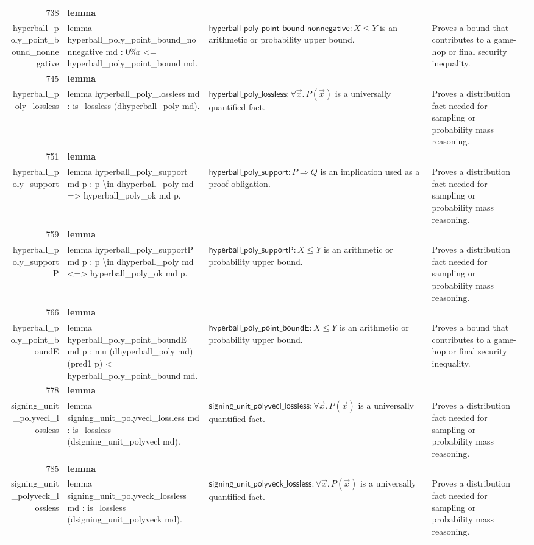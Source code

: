 \documentclass[10pt]{article}
\newcommand{\ec}[1]{\begingroup\ttfamily\scriptsize #1\endgroup}
\begin{document}
\begin{longtable}{r L{0.17\textwidth} L{0.26\textwidth} L{0.27\textwidth} L{0.20\textwidth}}
738 & \textbf{lemma}\\\ec{hyperball\_poly\_point\_bound\_nonnegative} & \ec{lemma hyperball\_poly\_point\_bound\_nonnegative md : 0\%r <= hyperball\_poly\_point\_bound md.} & \(\mathsf{hyperball\_poly\_point\_bound\_nonnegative} : X \le Y\) is an arithmetic or probability upper bound. & Proves a bound that contributes to a game-hop or final security inequality. \\
745 & \textbf{lemma}\\\ec{hyperball\_poly\_lossless} & \ec{lemma hyperball\_poly\_lossless md : is\_lossless (dhyperball\_poly md).} & \(\mathsf{hyperball\_poly\_lossless} : \forall \vec{x}.\, P(\vec{x})\) is a universally quantified fact. & Proves a distribution fact needed for sampling or probability mass reasoning. \\
751 & \textbf{lemma}\\\ec{hyperball\_poly\_support} & \ec{lemma hyperball\_poly\_support md p : p \textbackslash{}in dhyperball\_poly md => hyperball\_poly\_ok md p.} & \(\mathsf{hyperball\_poly\_support} : P \Rightarrow Q\) is an implication used as a proof obligation. & Proves a distribution fact needed for sampling or probability mass reasoning. \\
759 & \textbf{lemma}\\\ec{hyperball\_poly\_supportP} & \ec{lemma hyperball\_poly\_supportP md p : p \textbackslash{}in dhyperball\_poly md <=> hyperball\_poly\_ok md p.} & \(\mathsf{hyperball\_poly\_supportP} : X \le Y\) is an arithmetic or probability upper bound. & Proves a distribution fact needed for sampling or probability mass reasoning. \\
766 & \textbf{lemma}\\\ec{hyperball\_poly\_point\_boundE} & \ec{lemma hyperball\_poly\_point\_boundE md p : mu (dhyperball\_poly md) (pred1 p) <= hyperball\_poly\_point\_bound md.} & \(\mathsf{hyperball\_poly\_point\_boundE} : X \le Y\) is an arithmetic or probability upper bound. & Proves a bound that contributes to a game-hop or final security inequality. \\
778 & \textbf{lemma}\\\ec{signing\_unit\_polyvecl\_lossless} & \ec{lemma signing\_unit\_polyvecl\_lossless md : is\_lossless (dsigning\_unit\_polyvecl md).} & \(\mathsf{signing\_unit\_polyvecl\_lossless} : \forall \vec{x}.\, P(\vec{x})\) is a universally quantified fact. & Proves a distribution fact needed for sampling or probability mass reasoning. \\
785 & \textbf{lemma}\\\ec{signing\_unit\_polyveck\_lossless} & \ec{lemma signing\_unit\_polyveck\_lossless md : is\_lossless (dsigning\_unit\_polyveck md).} & \(\mathsf{signing\_unit\_polyveck\_lossless} : \forall \vec{x}.\, P(\vec{x})\) is a universally quantified fact. & Proves a distribution fact needed for sampling or probability mass reasoning. \\

\end{longtable}
\end{document}
